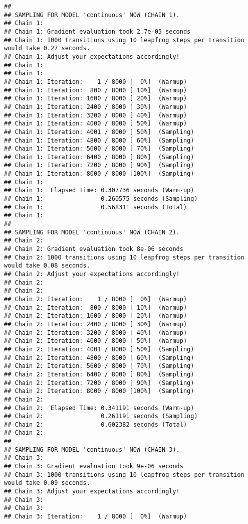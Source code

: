\documentclass[
]{article}
\begin{document}
\begin{verbatim}
## 
## SAMPLING FOR MODEL 'continuous' NOW (CHAIN 1).
## Chain 1: 
## Chain 1: Gradient evaluation took 2.7e-05 seconds
## Chain 1: 1000 transitions using 10 leapfrog steps per transition would take 0.27 seconds.
## Chain 1: Adjust your expectations accordingly!
## Chain 1: 
## Chain 1: 
## Chain 1: Iteration:    1 / 8000 [  0%]  (Warmup)
## Chain 1: Iteration:  800 / 8000 [ 10%]  (Warmup)
## Chain 1: Iteration: 1600 / 8000 [ 20%]  (Warmup)
## Chain 1: Iteration: 2400 / 8000 [ 30%]  (Warmup)
## Chain 1: Iteration: 3200 / 8000 [ 40%]  (Warmup)
## Chain 1: Iteration: 4000 / 8000 [ 50%]  (Warmup)
## Chain 1: Iteration: 4001 / 8000 [ 50%]  (Sampling)
## Chain 1: Iteration: 4800 / 8000 [ 60%]  (Sampling)
## Chain 1: Iteration: 5600 / 8000 [ 70%]  (Sampling)
## Chain 1: Iteration: 6400 / 8000 [ 80%]  (Sampling)
## Chain 1: Iteration: 7200 / 8000 [ 90%]  (Sampling)
## Chain 1: Iteration: 8000 / 8000 [100%]  (Sampling)
## Chain 1: 
## Chain 1:  Elapsed Time: 0.307736 seconds (Warm-up)
## Chain 1:                0.260575 seconds (Sampling)
## Chain 1:                0.568311 seconds (Total)
## Chain 1: 
## 
## SAMPLING FOR MODEL 'continuous' NOW (CHAIN 2).
## Chain 2: 
## Chain 2: Gradient evaluation took 8e-06 seconds
## Chain 2: 1000 transitions using 10 leapfrog steps per transition would take 0.08 seconds.
## Chain 2: Adjust your expectations accordingly!
## Chain 2: 
## Chain 2: 
## Chain 2: Iteration:    1 / 8000 [  0%]  (Warmup)
## Chain 2: Iteration:  800 / 8000 [ 10%]  (Warmup)
## Chain 2: Iteration: 1600 / 8000 [ 20%]  (Warmup)
## Chain 2: Iteration: 2400 / 8000 [ 30%]  (Warmup)
## Chain 2: Iteration: 3200 / 8000 [ 40%]  (Warmup)
## Chain 2: Iteration: 4000 / 8000 [ 50%]  (Warmup)
## Chain 2: Iteration: 4001 / 8000 [ 50%]  (Sampling)
## Chain 2: Iteration: 4800 / 8000 [ 60%]  (Sampling)
## Chain 2: Iteration: 5600 / 8000 [ 70%]  (Sampling)
## Chain 2: Iteration: 6400 / 8000 [ 80%]  (Sampling)
## Chain 2: Iteration: 7200 / 8000 [ 90%]  (Sampling)
## Chain 2: Iteration: 8000 / 8000 [100%]  (Sampling)
## Chain 2: 
## Chain 2:  Elapsed Time: 0.341191 seconds (Warm-up)
## Chain 2:                0.261191 seconds (Sampling)
## Chain 2:                0.602382 seconds (Total)
## Chain 2: 
## 
## SAMPLING FOR MODEL 'continuous' NOW (CHAIN 3).
## Chain 3: 
## Chain 3: Gradient evaluation took 9e-06 seconds
## Chain 3: 1000 transitions using 10 leapfrog steps per transition would take 0.09 seconds.
## Chain 3: Adjust your expectations accordingly!
## Chain 3: 
## Chain 3: 
## Chain 3: Iteration:    1 / 8000 [  0%]  (Warmup)

\end{verbatim}
\end{document}
